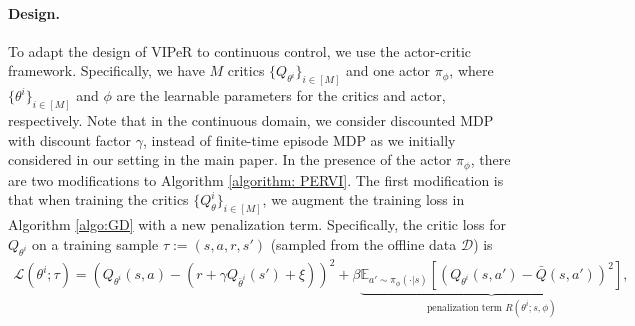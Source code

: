 \documentclass{article} \usepackage{iclr2023/iclr2023_conference,times}
\def\gD{{\mathcal{D}}}
\def\gL{{\mathcal{L}}}
\begin{document}
\paragraph{Design.} To adapt the design of VIPeR to continuous control, we use the actor-critic framework. Specifically, we have $M$ critics $\{{Q}_{\theta^i}\}_{i \in [M]}$ and one actor $\pi_{\phi}$, where $\{\theta^i\}_{i\in [M]}$ and $\phi$ are the learnable parameters for the critics and actor, respectively. Note that in the continuous domain, we consider discounted MDP with discount factor $\gamma$, instead of finite-time episode MDP as we initially considered in our setting in the main paper. In the presence of the actor $\pi_{\phi}$, there are two modifications to Algorithm \ref{algorithm: PERVI}. The first modification is that when training the critics $\{{Q}_{\theta}^i\}_{i \in [M]}$, we augment the training loss in Algorithm \ref{algo:GD} with a new penalization term. Specifically, the critic loss for $Q_{\theta^i}$ on a training sample $\tau := (s,a,r,s')$ (sampled from the offline data $\gD$) is 
\begin{align}
    \gL(\theta^i; \tau) = \left(Q_{\theta^i}(s, a) - (r + \gamma  Q_{\bar{\theta}^i}(s') + \xi ) \right)^2 +  \beta \underbrace{\mathbb{E}_{a' \sim \pi_{\phi}
(\cdot| s)} \left[ (Q_{\theta^i}(s, a') - \bar{Q}(s, a') )^2 \right]}_{\text{penalization term } R(\theta^i; s, \phi) },
\label{eq: new critic loss for continuous domain}
\end{align}
\end{document}

